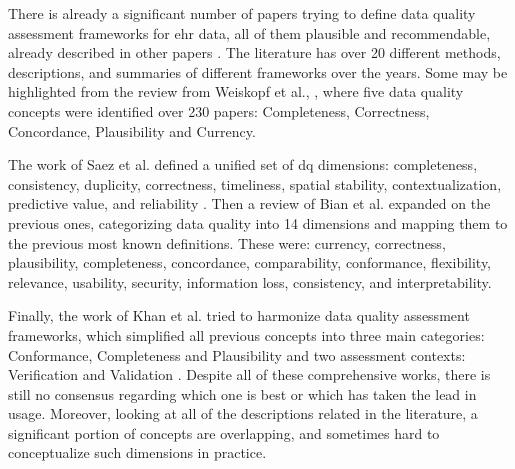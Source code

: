 There is already a significant number of papers trying to define data quality assessment frameworks for \ac{ehr} data, all of them plausible and recommendable, already described in other papers \cite{bianAssessingPracticeData2020}. The literature has over 20 different methods, descriptions, and summaries of  different frameworks over the years. Some may be highlighted from the review from Weiskopf et al., \cite{weiskopfMethodsDimensionsElectronic2013}, where five data quality concepts were identified over 230 papers: Completeness, Correctness, Concordance, Plausibility and Currency. 



The work of Saez et al. defined a unified set of \ac{dq} dimensions: completeness, consistency, duplicity, correctness, timeliness, spatial stability, contextualization, predictive value, and reliability \cite{saezOrganizingDataQuality2012}. Then a review of Bian et al. \cite{bianAssessingPracticeData2020} expanded on the previous ones, categorizing data quality into 14 dimensions and mapping them to the previous most known definitions. These were: currency, correctness, plausibility, completeness, concordance, comparability, conformance, flexibility, relevance, usability, security, information loss, consistency, and interpretability.

Finally, the work of Khan et al. tried to harmonize data quality assessment frameworks, which simplified all previous concepts into three main categories: Conformance, Completeness and Plausibility and two assessment contexts: Verification and Validation \cite{kahnHarmonizedDataQuality2016a}.
Despite all of these comprehensive works, there is still no consensus regarding which one is best or which has taken the lead in usage. Moreover, looking at all of the descriptions related in the literature, a significant portion of concepts are overlapping, and sometimes hard to conceptualize such dimensions in practice.

